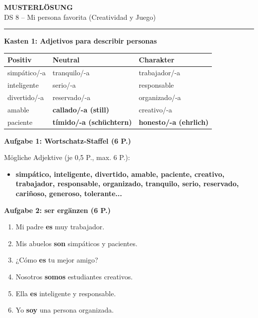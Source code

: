 \documentclass[11pt,a4paper]{article}
\newcommand{\lsg}[1]{\textcolor{loesung}{\textbf{#1}}}
\begin{document}
\begin{center}
{\Large\textbf{\textcolor{loesung}{MUSTERLÖSUNG}}}\\[0.3em]
{\large DS 8 -- Mi persona favorita (Creatividad y Juego)}
\end{center}

\vspace{0.5em}
\hrule
\vspace{1em}

\begin{gruppenbox}

\textbf{Kasten 1: Adjetivos para describir personas}

\begin{tabularx}{\textwidth}{@{}|X|X|X|@{}}
\hline
\textbf{Positiv} & \textbf{Neutral} & \textbf{Charakter} \\
\hline
simpático/-a & tranquilo/-a & trabajador/-a \\
inteligente & serio/-a & responsable \\
divertido/-a & reservado/-a & organizado/-a \\
amable & \lsg{callado/-a (still)} & creativo/-a \\
paciente & \lsg{tímido/-a (schüchtern)} & \lsg{honesto/-a (ehrlich)} \\
\hline
\end{tabularx}

\vspace{0.8em}

\textbf{Aufgabe 1: Wortschatz-Staffel (6 P.)}

Mögliche Adjektive (je 0,5 P., max. 6 P.):
\begin{itemize}[leftmargin=1.5em, nosep]
    \item \lsg{simpático, inteligente, divertido, amable, paciente, creativo, trabajador, responsable, organizado, tranquilo, serio, reservado, cariñoso, generoso, tolerante...}
\end{itemize}

\vspace{0.5em}

\textbf{Aufgabe 2: ser ergänzen (6 P.)}
\begin{enumerate}[label=\alph*), leftmargin=2em, nosep]
    \item Mi padre \lsg{es} muy trabajador.
    \item Mis abuelos \lsg{son} simpáticos y pacientes.
    \item ¿Cómo \lsg{es} tu mejor amigo?
    \item Nosotros \lsg{somos} estudiantes creativos.
    \item Ella \lsg{es} inteligente y responsable.
    \item Yo \lsg{soy} una persona organizada.
\end{enumerate}


\end{gruppenbox}
\end{document}
